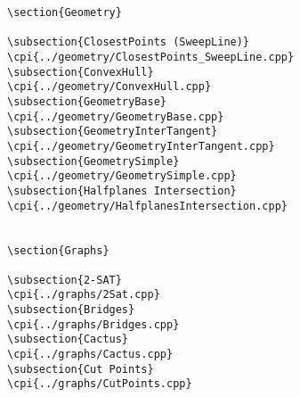 {\begin{verbatim}
\section{Geometry}

\subsection{ClosestPoints (SweepLine)}
\cpi{../geometry/ClosestPoints_SweepLine.cpp}
\subsection{ConvexHull}
\cpi{../geometry/ConvexHull.cpp}
\subsection{GeometryBase}
\cpi{../geometry/GeometryBase.cpp}
\subsection{GeometryInterTangent}
\cpi{../geometry/GeometryInterTangent.cpp}
\subsection{GeometrySimple}
\cpi{../geometry/GeometrySimple.cpp}
\subsection{Halfplanes Intersection}
\cpi{../geometry/HalfplanesIntersection.cpp}


\section{Graphs}

\subsection{2-SAT}
\cpi{../graphs/2Sat.cpp}
\subsection{Bridges}
\cpi{../graphs/Bridges.cpp}
\subsection{Cactus}
\cpi{../graphs/Cactus.cpp}
\subsection{Cut Points}
\cpi{../graphs/CutPoints.cpp}

\end{verbatim}}
